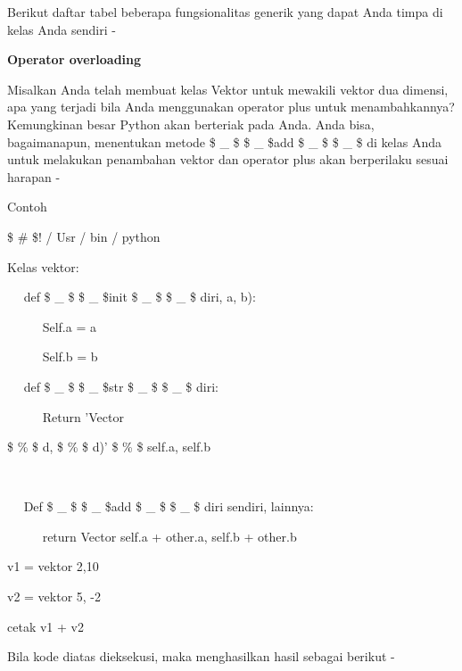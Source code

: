 \begin{12pt}
\begin{12pt}
\begin{12pt}
\begin{12pt}
\begin{12pt}
\begin{12pt}
\begin{12pt}
\begin{12pt}
\begin{12pt}
\begin{12pt}
\begin{12pt}
\begin{12pt}
\begin{12pt}
\begin{12pt}
\begin{12pt}
\begin{12pt}
\begin{12pt}
\begin{12pt}
\begin{12pt}
\begin{12pt}
\begin{12pt}
\begin{12pt}
\begin{12pt}
\vspace{12pt}
\noindent 
Berikut daftar tabel beberapa fungsionalitas generik yang dapat Anda timpa di kelas Anda sendiri - \par
\vspace{14pt}
\noindent 
{\fontsize{14pt}{14pt}\selectfont \textbf{Operator overloading} \\} \par
\begin{12pt}
Misalkan Anda telah membuat kelas Vektor untuk mewakili vektor dua dimensi, apa yang terjadi bila Anda menggunakan operator plus untuk menambahkannya? Kemungkinan besar Python akan berteriak pada Anda. Anda bisa, bagaimanapun, menentukan metode  \$  \_  \$ \$  \_  \$add \$  \_  \$ \$  \_  \$ di kelas Anda untuk melakukan penambahan vektor dan operator plus akan berperilaku sesuai harapan - \par
Contoh \par
\vspace{12pt}
\noindent 
 \$  \#  \$! / Usr / bin / python \par
\vspace{12pt}
\noindent 
Kelas vektor: \par
\noindent 
~~ def  \$  \_  \$ \$  \_  \$init  \$  \_  \$ \$  \_  \$ diri, a, b): \par
\noindent 
~~~~~ Self.a = a \par
\noindent 
~~~~~ Self.b = b \par
\vspace{12pt}
\noindent 
~~ def  \$  \_  \$ \$  \_  \$str  \$  \_  \$ \$  \_  \$ {diri}: \par
\noindent 
~~~~~ Return 'Vector {\$  \%  \$ d, \$  \%  \$ d)' \$  \%  \$ {self.a, self.b} \par
\noindent 
~~  \par
\noindent 
~~ Def  \$  \_  \$ \$  \_  \$add  \$  \_  \$ \$  \_  \$ {diri sendiri, lainnya}: \par
\noindent 
~~~~~ return Vector {self.a + other.a, self.b + other.b} \par
\vspace{12pt}
\noindent 
v1 = vektor {2,10} \par
\noindent 
v2 = vektor {5, -2} \par
\noindent 
cetak v1 + v2 \par
\vspace{12pt}
\noindent 
Bila kode diatas dieksekusi, maka menghasilkan hasil sebagai berikut - \par
\vspace{12pt}
}
\end{12pt}
\end{12pt}
\end{12pt}
\end{12pt}
\end{12pt}
\end{12pt}
\end{12pt}
\end{12pt}
\end{12pt}
\end{12pt}
\end{12pt}
\end{12pt}
\end{12pt}
\end{12pt}
\end{12pt}
\end{12pt}
\end{12pt}
\end{12pt}
\end{12pt}
\end{12pt}
\end{12pt}
\end{12pt}
\end{12pt}
\end{12pt}
